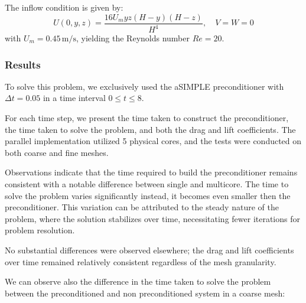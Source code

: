 \documentclass{article}
\begin{document}
The inflow condition is given by:
\[
U(0, y, z) = \frac{16U_m yz (H - y)(H - z)}{H^4}, \quad V = W = 0
\]
with \(U_m = 0.45 \, \text{m/s}\), yielding the Reynolds number \(Re = 20\). 

\subsubsection*{Results}

To solve this problem, we exclusively used the aSIMPLE preconditioner with \(\Delta t = 0.05\) in a time interval \(0 \leq t \leq 8\).

For each time step, we present the time taken to construct the preconditioner, the time taken to solve the problem, and both the drag and lift coefficients. The parallel implementation utilized 5 physical cores, and the tests were conducted on both coarse and fine meshes.

\begin{figure}[h]
    \centering

    \hfill
\vspace{1em} %
    \hfill
\vspace{1em} %
\end{figure}

Observations indicate that the time required to build the preconditioner remains consistent with a notable difference between single and multicore. 
The time to solve the problem varies significantly instead, it becomes even smaller then the preconditioner. This variation can be attributed to the steady nature of the problem, where the solution stabilizes over time, necessitating fewer iterations for problem resolution.

No substantial differences were observed elsewhere; the drag and lift coefficients over time remained relatively consistent regardless of the mesh granularity.

We can observe also the difference in the time taken to solve the problem between the preconditioned and non preconditioned system in a coarse mesh:
\end{document}
